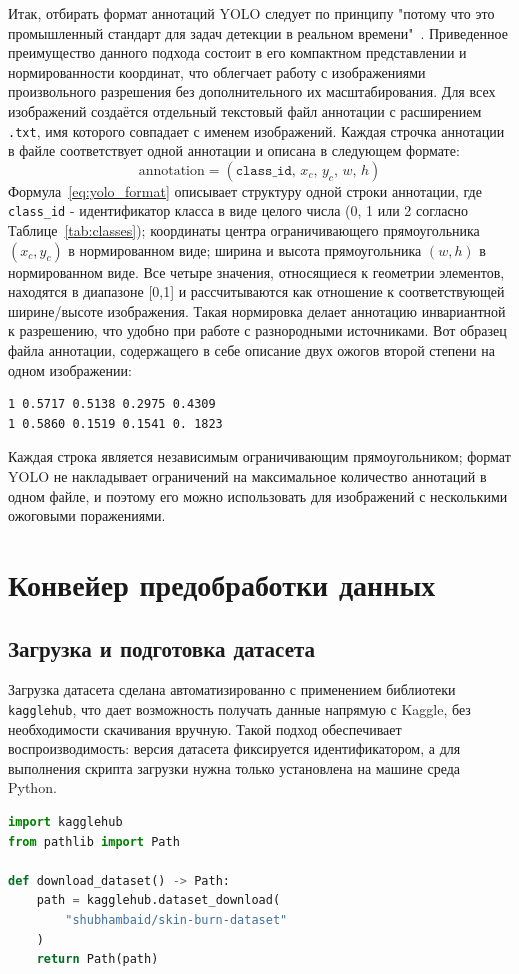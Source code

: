 Итак, отбирать формат аннотаций YOLO следует по принципу "потому что это промышленный стандарт для задач детекции в реальном времени"~\cite{redmon2016yolo,ultralytics2023yolov8}. Приведенное преимущество данного подхода состоит в его компактном представлении и нормированности координат, что облегчает работу с изображениями произвольного разрешения без дополнительного их масштабирования.
Для всех изображений создаётся отдельный текстовый файл аннотации с расширением \texttt{.txt}, имя которого совпадает с именем изображений. Каждая строчка аннотации в файле соответствует одной аннотации и описана в следующем формате:
\begin{equation}
\text{annotation} = (\texttt{class\_id},\, x_c,\, y_c,\, w,\, h)
\label{eq:yolo_format}
\end{equation}
Формула~\eqref{eq:yolo_format} описывает структуру одной строки аннотации, где \texttt{class\_id} - идентификатор класса в виде целого числа (0, 1 или 2 согласно Таблице~\ref{tab:classes}); координаты центра ограничивающего прямоугольника $(x_c, y_c)$ в нормированном виде; ширина и высота прямоугольника $(w, h)$ в нормированном виде. Все четыре значения, относящиеся к геометрии элементов, находятся в диапазоне [0,1] и рассчитываются как отношение к соответствующей ширине/высоте изображения. Такая нормировка делает аннотацию инвариантной к разрешению, что удобно при работе с разнородными источниками. Вот образец файла аннотации, содержащего в себе описание двух ожогов второй степени на одном изображении:

\begin{verbatim}
1 0.5717 0.5138 0.2975 0.4309
1 0.5860 0.1519 0.1541 0. 1823
\end{verbatim}

Каждая строка является независимым ограничивающим прямоугольником; формат YOLO не накладывает ограничений на максимальное количество аннотаций в одном файле, и поэтому его можно использовать для изображений с несколькими ожоговыми поражениями. \section{Конвейер предобработки данных}

\subsection{Загрузка и подготовка датасета}

Загрузка датасета сделана автоматизированно с применением библиотеки \texttt{kagglehub}, что дает возможность получать данные напрямую с Kaggle, без необходимости скачивания вручную. Такой подход обеспечивает воспроизводимость: версия датасета фиксируется идентификатором, а для выполнения скрипта загрузки нужна только установлена на машине среда Python. \begin{lstlisting}[language=Python, caption=Загрузка датасета из Kaggle с использованием \texttt{kagglehub}, label=lst:download]
import kagglehub
from pathlib import Path

def download_dataset() -> Path:
    path = kagglehub.dataset_download(
        "shubhambaid/skin-burn-dataset"
    )
    return Path(path)
\end{lstlisting}

